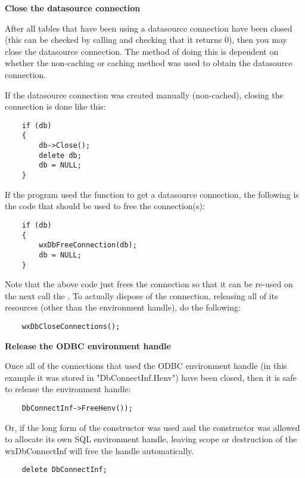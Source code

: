 {\bf Close the datasource connection}

After all tables that have been using a datasource connection have been 
closed (this can be checked by calling  
and checking that it returns 0), then you may close the datasource 
connection.  The method of doing this is dependent on whether the 
non-caching or caching method was used to obtain the datasource connection.

If the datasource connection was created manually (non-cached), closing the 
connection is done like this:

\begin{verbatim}
    if (db)
    {
        db->Close();
        delete db;
        db = NULL;
    }
\end{verbatim}

If the program used the  function to get a datasource 
connection, the following is the code that should be used to free the 
connection(s):

\begin{verbatim}
    if (db)
    {
        wxDbFreeConnection(db);
        db = NULL;
    }
\end{verbatim}

Note that the above code just frees the connection so that it can be 
re-used on the next call the .  To actually dispose 
of the connection, releasing all of its resources (other than the 
environment handle), do the following:

\begin{verbatim}
    wxDbCloseConnections();
\end{verbatim}


{\bf Release the ODBC environment handle}

Once all of the connections that used the ODBC environment handle (in 
this example it was stored in "DbConnectInf.Henv") have been closed, then 
it is safe to release the environment handle:

\begin{verbatim}
    DbConnectInf->FreeHenv());
\end{verbatim}

Or, if the long form of the constructor was used and the constructor was allowed 
to allocate its own SQL environment handle, leaving scope or destruction of the 
wxDbConnectInf will free the handle automatically.

\begin{verbatim}
    delete DbConnectInf;
\end{verbatim}

